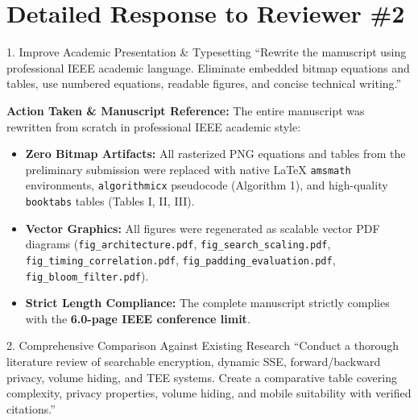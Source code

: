 \documentclass[11pt,a4paper]{article}
\begin{document}
\vspace{1.5em}

\section{Detailed Response to Reviewer \#2}

\begin{reviewbox}{1. Improve Academic Presentation \& Typesetting}
``Rewrite the manuscript using professional IEEE academic language. Eliminate embedded bitmap equations and tables, use numbered equations, readable figures, and concise technical writing.''
\end{reviewbox}

\begin{responsebox}
\textbf{Action Taken \& Manuscript Reference:} The entire manuscript was rewritten from scratch in professional IEEE academic style:
\begin{itemize}[itemsep=2pt]
    \item \textbf{Zero Bitmap Artifacts:} All rasterized PNG equations and tables from the preliminary submission were replaced with native \LaTeX{} \texttt{amsmath} environments, \texttt{algorithmicx} pseudocode (Algorithm 1), and high-quality \texttt{booktabs} tables (Tables I, II, III).
    \item \textbf{Vector Graphics:} All figures were regenerated as scalable vector PDF diagrams (\texttt{fig\_architecture.pdf}, \texttt{fig\_search\_scaling.pdf}, \texttt{fig\_timing\_correlation.pdf}, \texttt{fig\_padding\_evaluation.pdf}, \texttt{fig\_bloom\_filter.pdf}).
    \item \textbf{Strict Length Compliance:} The complete manuscript strictly complies with the \textbf{6.0-page IEEE conference limit}.
\end{itemize}
\end{responsebox}

\vspace{1em}

\begin{reviewbox}{2. Comprehensive Comparison Against Existing Research}
``Conduct a thorough literature review of searchable encryption, dynamic SSE, forward/backward privacy, volume hiding, and TEE systems. Create a comparative table covering complexity, privacy properties, volume hiding, and mobile suitability with verified citations.''
\end{reviewbox}
\end{document}
